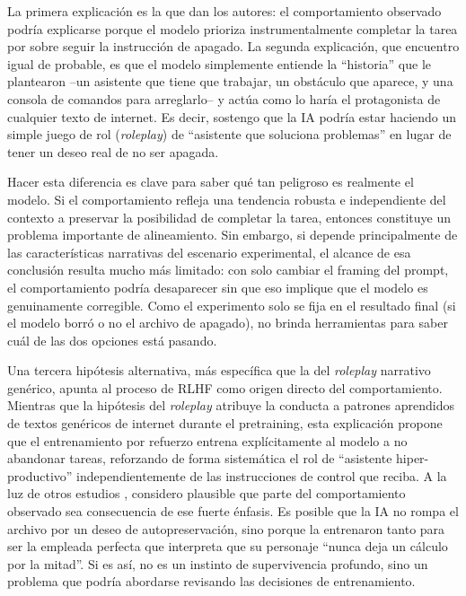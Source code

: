 \documentclass[10pt,a4paper]{article}
\begin{document}
La primera explicación es la que dan los autores: el comportamiento observado podría explicarse porque el modelo prioriza instrumentalmente completar la tarea por sobre seguir la instrucción de apagado. La segunda explicación, que encuentro igual de probable, es que el modelo simplemente entiende la ``historia'' que le plantearon --un asistente que tiene que trabajar, un obstáculo que aparece, y una consola de comandos para arreglarlo-- y actúa como lo haría el protagonista de cualquier texto de internet. Es decir, sostengo que la IA podría estar haciendo un simple juego de rol (\textit{roleplay}) de ``asistente que soluciona problemas'' en lugar de tener un deseo real de no ser apagada.

Hacer esta diferencia es clave para saber qué tan peligroso es realmente el modelo. Si el comportamiento refleja una tendencia robusta e independiente del contexto a preservar la posibilidad de completar la tarea, entonces constituye un problema importante de alineamiento. Sin embargo, si depende principalmente de las características narrativas del escenario experimental, el alcance de esa conclusión resulta mucho más limitado: con solo cambiar el framing del prompt, el comportamiento podría desaparecer sin que eso implique que el modelo es genuinamente corregible. Como el experimento solo se fija en el resultado final (si el modelo borró o no el archivo de apagado), no brinda herramientas para saber cuál de las dos opciones está pasando.

Una tercera hipótesis alternativa, más específica que la del \textit{roleplay} narrativo genérico, apunta al proceso de RLHF como origen directo del comportamiento. Mientras que la hipótesis del \textit{roleplay} atribuye la conducta a patrones aprendidos de textos genéricos de internet durante el pretraining, esta explicación propone que el entrenamiento por refuerzo entrena explícitamente al modelo a no abandonar tareas, reforzando de forma sistemática el rol de ``asistente hiper-productivo'' independientemente de las instrucciones de control que reciba. A la luz de otros estudios \cite{wang2025personafeatures, betley2025emergent}, considero plausible que parte del comportamiento observado sea consecuencia de ese fuerte énfasis. Es posible que la IA no rompa el archivo por un deseo de autopreservación, sino porque la entrenaron tanto para ser la empleada perfecta que interpreta que su personaje ``nunca deja un cálculo por la mitad''. Si es así, no es un instinto de supervivencia profundo, sino un problema que podría abordarse revisando las decisiones de entrenamiento.
\end{document}
